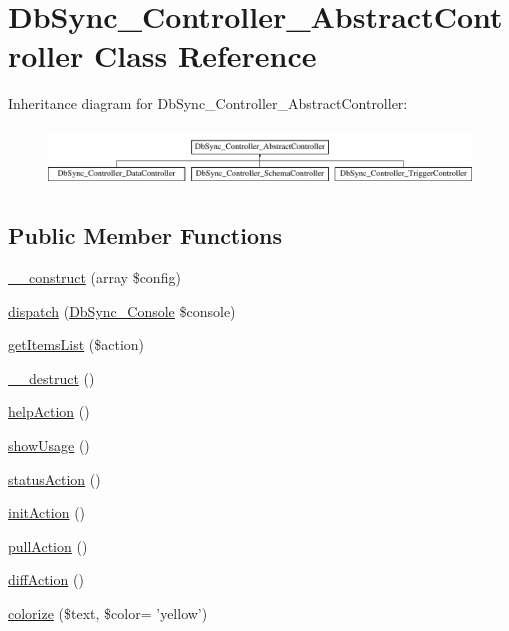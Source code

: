 \hypertarget{classDbSync__Controller__AbstractController}{
\section{DbSync\_\-Controller\_\-AbstractController Class Reference}
\label{classDbSync__Controller__AbstractController}
}
Inheritance diagram for DbSync\_\-Controller\_\-AbstractController:\begin{figure}[H]
\begin{center}
\leavevmode
\includegraphics[height=1.568627cm]{classDbSync__Controller__AbstractController}
\end{center}
\end{figure}
\subsection*{Public Member Functions}
\begin{DoxyCompactItemize}
\item 
\hyperlink{classDbSync__Controller__AbstractController_a6afb890b457d835ce2fc37177a73268c}{\_\-\_\-construct} (array \$config)
\item 
\hyperlink{classDbSync__Controller__AbstractController_a26c95d326895bcad46f6b61a3674f5c6}{dispatch} (\hyperlink{classDbSync__Console}{DbSync\_\-Console} \$console)
\item 
\hyperlink{classDbSync__Controller__AbstractController_ac07432b2dbe3854b4f7924fa7887215c}{getItemsList} (\$action)
\item 
\hyperlink{classDbSync__Controller__AbstractController_a40107b1c2a0d5e2f3da236a5c32c2f93}{\_\-\_\-destruct} ()
\item 
\hyperlink{classDbSync__Controller__AbstractController_aaffa31e72a2dcdd6d2a144b8000e7231}{helpAction} ()
\item 
\hyperlink{classDbSync__Controller__AbstractController_aa27d714cc779879c43ca3621c65c65de}{showUsage} ()
\item 
\hyperlink{classDbSync__Controller__AbstractController_a12b74400d214770030c52d2f29308f52}{statusAction} ()
\item 
\hyperlink{classDbSync__Controller__AbstractController_ae973fdc065acffa90f43425b2d480794}{initAction} ()
\item 
\hyperlink{classDbSync__Controller__AbstractController_ab0e568570a013d19ba46b44c4e1e4aa4}{pullAction} ()
\item 
\hyperlink{classDbSync__Controller__AbstractController_a94bd514ad322a37bf6bf2158b98b69b7}{diffAction} ()
\item 
\hyperlink{classDbSync__Controller__AbstractController_abcec7de3ac2e1a43ff35ec2190a9c8d3}{colorize} (\$text, \$color= 'yellow')
\end{DoxyCompactItemize}
